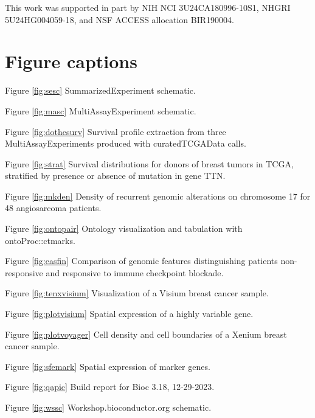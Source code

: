 \documentclass[graybox]{svmult}
\begin{document}
This work was supported in part by NIH NCI 3U24CA180996-10S1, NHGRI 5U24HG004059-18, and NSF ACCESS allocation BIR190004.


%



\section{Figure captions}

Figure \ref{fig:sesc} SummarizedExperiment schematic.

Figure \ref{fig:masc} MultiAssayExperiment schematic.

Figure \ref{fig:dothesurv} Survival profile extraction from three MultiAssayExperiments produced with curatedTCGAData calls.

Figure \ref{fig:strat} Survival distributions for donors of breast tumors in TCGA, stratified by presence or absence of mutation in gene TTN.

Figure \ref{fig:mkden} Density of recurrent genomic alterations on chromosome 17 for 48 angiosarcoma patients.


Figure \ref{fig:ontopair} Ontology visualization and tabulation with ontoProc::ctmarks.

Figure \ref{fig:easfin} Comparison of genomic features distinguishing patients non-responsive and responsive to immune checkpoint blockade.

Figure \ref{fig:tenxvisium} Visualization of a Visium breast cancer sample.

Figure \ref{fig:plotvisium} Spatial expression of a highly variable gene.

Figure \ref{fig:plotvoyager} Cell density and cell boundaries of a Xenium breast cancer sample.

Figure \ref{fig:sfemark} Spatial expression of marker genes.

Figure \ref{fig:qapic} Build report for Bioc 3.18, 12-29-2023.

Figure \ref{fig:wssc} Workshop.bioconductor.org schematic.
\end{document}
